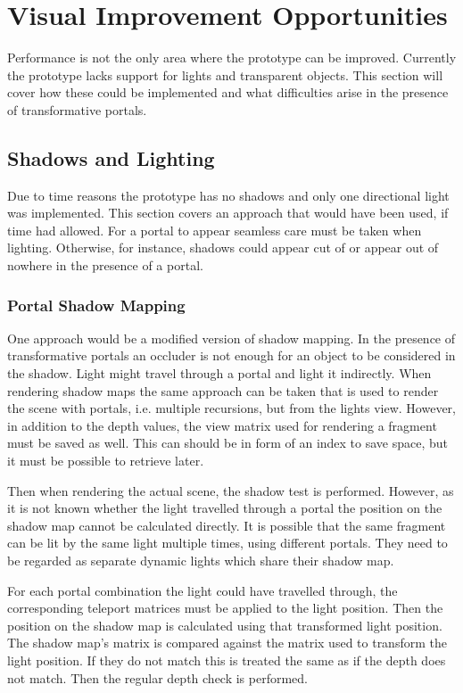 \chapter{Visual Improvement Opportunities}
Performance is not the only area where the prototype can be improved. Currently the prototype lacks support for lights and transparent objects. This section will cover how these could be implemented and what difficulties arise in the presence of transformative portals.

\section{Shadows and Lighting}
Due to time reasons the prototype has no shadows and only one directional light was implemented. This section covers an approach that would have been used, if time had allowed. For a portal to appear seamless care must be taken when lighting. Otherwise, for instance, shadows could appear cut of or appear out of nowhere in the presence of a portal.

\subsection{Portal Shadow Mapping}
One approach would be a modified version of shadow mapping. In the presence of transformative portals an occluder is not enough for an object to be considered in the shadow. Light might travel through a portal and light it indirectly. When rendering shadow maps the same approach can be taken that is used to render the scene with portals, i.e. multiple recursions, but from the lights view. However, in addition to the depth values, the view matrix used for rendering a fragment must be saved as well. This can should be in form of an index to save space, but it must be possible to retrieve later. 

Then when rendering the actual scene, the shadow test is performed. However, as it is not known whether the light travelled through a portal the position on the shadow map cannot be calculated directly. It is possible that the same fragment can be lit by the same light multiple times, using different portals. They need to be regarded as separate dynamic lights which share their shadow map.

For each portal combination the light could have travelled through, the corresponding teleport matrices must be applied to the light position. Then the position on the shadow map is calculated using that transformed light position. The shadow map's matrix is compared against the matrix used to transform the light position. If they do not match this is treated the same as if the depth does not match. Then the regular depth check is performed.


